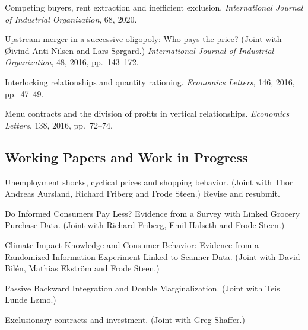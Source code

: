 \documentclass[10pt,a4paper]{article}
\begin{document}
\begin{pubs}
  \item Competing buyers, rent extraction and inefficient exclusion.
        \emph{International Journal of Industrial Organization}, 68, 2020.

  \item Upstream merger in a successive oligopoly: Who pays the price? (Joint
        with Øivind Anti Nilsen and Lars Sørgard.) \emph{International Journal
        of Industrial Organization}, 48, 2016, pp.~143--172.

  \item Interlocking relationships and quantity rationing.
        \emph{Economics Letters}, 146, 2016, pp.~47--49.

  \item Menu contracts and the division of profits in vertical relationships.
        \emph{Economics Letters}, 138, 2016, pp.~72--74.
\end{pubs}

\subsection*{Working Papers and Work in Progress}

\begin{pubs}
  \item Unemployment shocks, cyclical prices and shopping behavior. (Joint with
        Thor Andreas Aursland, Richard Friberg and Frode Steen.)
        Revise and resubmit.

  \item Do Informed Consumers Pay Less? Evidence from a Survey with Linked
        Grocery Purchase Data. (Joint with Richard Friberg, Emil Halseth and
        Frode Steen.)

  \item Climate-Impact Knowledge and Consumer Behavior: Evidence from a
        Randomized Information Experiment Linked to Scanner Data. (Joint with
        David Bilén, Mathias Ekström and Frode Steen.)

  \item Passive Backward Integration and Double Marginalization. (Joint with
        Teis Lunde Lømo.)

  \item Exclusionary contracts and investment. (Joint with Greg Shaffer.)
\end{pubs}
\end{document}
